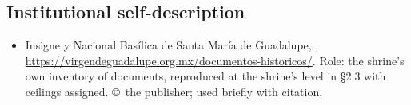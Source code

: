 \subsection*{Institutional self-description}

\begin{itemize}
\item Insigne y Nacional Bas\'ilica de Santa Mar\'ia de Guadalupe,
,
\url{https://virgendeguadalupe.org.mx/documentos-historicos/}.
Role: the shrine's own inventory of documents, reproduced at the
shrine's level in \S2.3 with ceilings assigned. \copyright\ the
publisher; used briefly with citation.
\end{itemize}
